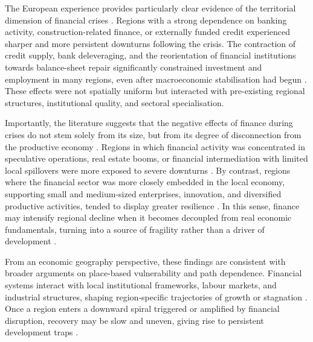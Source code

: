 \documentclass[a4paper,11pt,oneside]{article}
\begin{document}
The European experience provides particularly clear evidence of the territorial dimension of financial crises \citep{pastor2017rich,rossi2021financial,martin2019financial}. Regions with a strong dependence on banking activity, construction-related finance, or externally funded credit experienced sharper and more persistent downturns following the crisis. The contraction of credit supply, bank deleveraging, and the reorientation of financial institutions towards balance-sheet repair significantly constrained investment and employment in many regions, even after macroeconomic stabilisation had begun \citep{moro2014lessons}. These effects were not spatially uniform but interacted with pre-existing regional structures, institutional quality, and sectoral specialisation.


Importantly, the literature suggests that the negative effects of finance during crises do not stem solely from its size, but from its degree of disconnection from the productive economy \citep{arcand2015too}. Regions in which financial activity was concentrated in speculative operations, real estate booms, or financial intermediation with limited local spillovers were more exposed to severe downturns \citep{dore2008financialization,martin2011local}. By contrast, regions where the financial sector was more closely embedded in the local economy, supporting small and medium-sized enterprises, innovation, and diversified productive activities, tended to display greater resilience \citep{guiso2009does}. In this sense, finance may intensify regional decline when it becomes decoupled from real economic fundamentals, turning into a source of fragility rather than a driver of development \citep{crescenzi2016government}.




From an economic geography perspective, these findings are consistent with broader arguments on place-based vulnerability and path dependence. Financial systems interact with local institutional frameworks, labour markets, and industrial structures, shaping region-specific trajectories of growth or stagnation \citep{rodriguez2013institutions}. Once a region enters a downward spiral triggered or amplified by financial disruption, recovery may be slow and uneven, giving rise to persistent development traps \citep{rodriguez2018revenge}.




\end{document}
